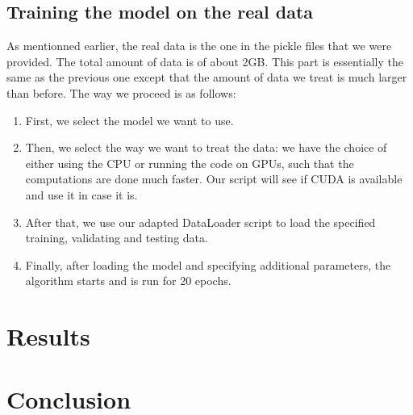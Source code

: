 \documentclass[10pt,conference]{IEEEtran}
\begin{document}
\subsection{Training the model on the real data}
As mentionned earlier, the real data is the one in the pickle files that we were provided. The total amount of data is of about 2GB. This part is essentially the same as the previous one except that the amount of data we treat is much larger than before. The way we proceed is as follows:
\begin{enumerate}
  \item First, we select the model we want to use.
  \item Then, we select the way we want to treat the data: we have the choice of either using the CPU or running the code on GPUs, such that the computations are done much faster. Our script will see if CUDA is available and use it in case it is.
  \item After that, we use our adapted DataLoader script to load the specified training, validating and testing data.
  \item Finally, after loading the model and specifying additional parameters, the algorithm starts and is run for 20 epochs.
\end{enumerate}

\section{Results}

\section{Conclusion}



\end{document}
